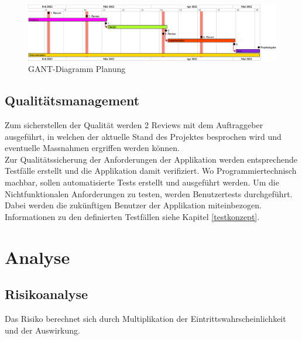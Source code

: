\vspace*{3mm}

\begin{figure}[H]
    \begin{center}
        \includegraphics[width=0.95\linewidth]{content/diagrams/out/planning/planning.png}
        \caption{GANT-Diagramm Planung}
      \end{center}
\end{figure}

\subsection{Qualitätsmanagement}
Zum sicherstellen der Qualität werden 2 Reviews mit dem Auftraggeber ausgeführt, in welchen der aktuelle Stand des Projektes besprochen wird und eventuelle Massnahmen ergriffen werden können. \\
Zur Qualitätssicherung der Anforderungen der Applikation werden entsprechende Testfälle erstellt und die Applikation damit verifiziert. Wo Programmiertechnisch machbar, sollen automatisierte Tests erstellt und ausgeführt werden. Um die Nichtfunktionalen Anforderungen zu testen, werden Benutzertests durchgeführt. Dabei werden die zukünftigen Benutzer der Applikation miteinbezogen. Informationen zu den definierten Testfällen siehe Kapitel \ref{testkonzept}.

\newpage
\section{Analyse}
\subsection{Risikoanalyse}
Das Risiko berechnet sich durch Multiplikation der Eintrittswahrscheinlichkeit und der Auswirkung. \\

